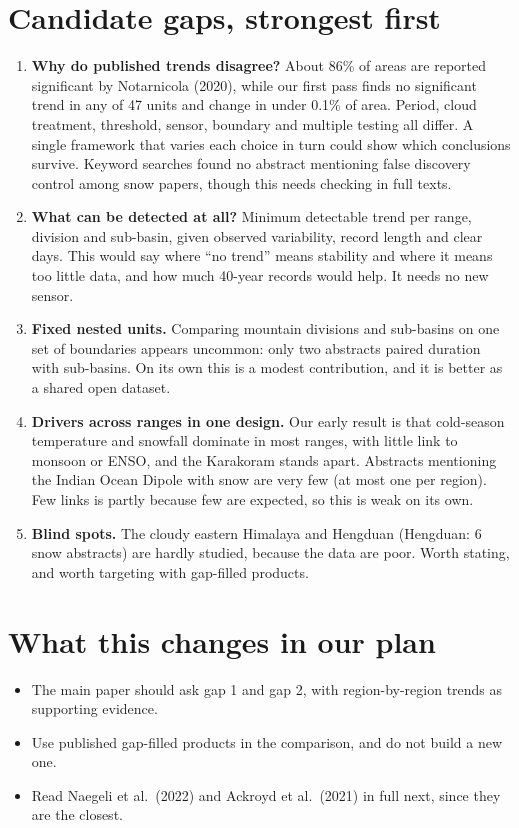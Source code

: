 \documentclass[11pt,a4paper]{article}
\begin{document}
\section{Candidate gaps, strongest first}
\begin{enumerate}
\item \textbf{Why do published trends disagree?} About 86\% of areas are reported significant by Notarnicola (2020), while our first pass finds no significant trend in any of 47 units and change in under 0.1\% of area. Period, cloud treatment, threshold, sensor, boundary and multiple testing all differ. A single framework that varies each choice in turn could show which conclusions survive. Keyword searches found no abstract mentioning false discovery control among snow papers, though this needs checking in full texts.
\item \textbf{What can be detected at all?} Minimum detectable trend per range, division and sub-basin, given observed variability, record length and clear days. This would say where ``no trend'' means stability and where it means too little data, and how much 40-year records would help. It needs no new sensor.
\item \textbf{Fixed nested units.} Comparing mountain divisions and sub-basins on one set of boundaries appears uncommon: only two abstracts paired duration with sub-basins. On its own this is a modest contribution, and it is better as a shared open dataset.
\item \textbf{Drivers across ranges in one design.} Our early result is that cold-season temperature and snowfall dominate in most ranges, with little link to monsoon or ENSO, and the Karakoram stands apart. Abstracts mentioning the Indian Ocean Dipole with snow are very few (at most one per region). Few links is partly because few are expected, so this is weak on its own.
\item \textbf{Blind spots.} The cloudy eastern Himalaya and Hengduan (Hengduan: 6 snow abstracts) are hardly studied, because the data are poor. Worth stating, and worth targeting with gap-filled products.
\end{enumerate}

\section{What this changes in our plan}
\begin{itemize}
\item The main paper should ask gap 1 and gap 2, with region-by-region trends as supporting evidence.
\item Use published gap-filled products in the comparison, and do not build a new one.
\item Read Naegeli et al.\ (2022) and Ackroyd et al.\ (2021) in full next, since they are the closest.
\end{itemize}
\end{document}
